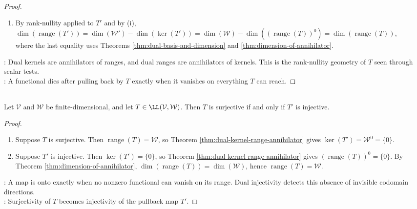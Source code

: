 \begin{theorem}
\begin{proof}
\begin{enumerate}[label=(\roman*)]
\item By rank-nullity applied to $T'$ and by (i),\\
$\dim(\operatorname{range}(T')) =\dim(\mathcal{W}')-\dim(\ker(T')) =\dim(\mathcal{W})-\dim((\operatorname{range}(T))^0) =\dim(\operatorname{range}(T))$,\\
where the last equality uses Theorems \ref{thm:dual-basis-and-dimension} and \ref{thm:dimension-of-annihilator}.
\end{enumerate}
: Dual kernels are annihilators of ranges, and dual ranges are annihilators of kernels. This is the rank-nullity geometry of $T$ seen through scalar tests.\\
: A functional dies after pulling back by $T$ exactly when it vanishes on everything $T$ can reach.
\end{proof}
\end{theorem}

\begin{corollary} \label{cor:surjective-iff-dual-injective} \\
Let $\mathcal{V}$ and $\mathcal{W}$ be finite-dimensional, and let $T\in\LL(\mathcal{V},\mathcal{W})$. Then $T$ is surjective if and only if $T'$ is injective.
\begin{proof}
\begin{enumerate}[label=\roman*.]
\setlength{\itemsep}{0pt}
\item[$(\Rightarrow)$] Suppose $T$ is surjective. Then $\operatorname{range}(T)=\mathcal{W}$, so Theorem \ref{thm:dual-kernel-range-annihilator} gives $\ker(T')=\mathcal{W}^0=\{0\}$.
\item[$(\Leftarrow)$] Suppose $T'$ is injective. Then $\ker(T')=\{0\}$, so Theorem \ref{thm:dual-kernel-range-annihilator} gives $(\operatorname{range}(T))^0=\{0\}$. By Theorem \ref{thm:dimension-of-annihilator}, $\dim(\operatorname{range}(T))=\dim(\mathcal{W})$, hence $\operatorname{range}(T)=\mathcal{W}$.
\end{enumerate}
: A map is onto exactly when no nonzero functional can vanish on its range. Dual injectivity detects this absence of invisible codomain directions.\\
: Surjectivity of $T$ becomes injectivity of the pullback map $T'$.
\end{proof}
\end{corollary}

